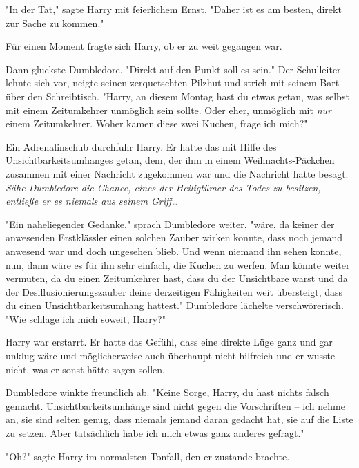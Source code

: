 {"In der Tat," sagte Harry mit feierlichem Ernst. "Daher ist es am besten, direkt zur Sache zu kommen."

Für einen Moment fragte sich Harry, ob er zu weit gegangen war.

Dann gluckste Dumbledore. "Direkt auf den Punkt soll es sein." Der Schulleiter lehnte sich vor, neigte seinen zerquetschten Pilzhut und strich mit seinem Bart über den Schreibtisch. "Harry, an diesem Montag hast du etwas getan, was selbst mit einem Zeitumkehrer unmöglich sein sollte. Oder eher, unmöglich mit \emph{nur} einem Zeitumkehrer. Woher kamen diese zwei Kuchen, frage ich mich?"

Ein Adrenalinschub durchfuhr Harry. Er hatte das mit Hilfe des Unsichtbarkeitsumhanges getan, dem, der ihm in einem Weihnachts-Päckchen zusammen mit einer Nachricht zugekommen war und die Nachricht hatte besagt: \emph{Sähe Dumbledore die Chance, eines der Heiligtümer des Todes zu besitzen, entließe er es niemals aus seinem Griff…}

"Ein naheliegender Gedanke," sprach Dumbledore weiter, "wäre, da keiner der anwesenden Erstklässler einen solchen Zauber wirken konnte, dass noch jemand anwesend war und doch ungesehen blieb. Und wenn niemand ihn sehen konnte, nun, dann wäre es für ihn sehr einfach, die Kuchen zu werfen. Man könnte weiter vermuten, da du einen Zeitumkehrer hast, dass du der Unsichtbare warst und da der Desillusionierungszauber deine derzeitigen Fähigkeiten weit übersteigt, dass du einen Unsichtbarkeitsumhang hattest." Dumbledore lächelte verschwörerisch. "Wie schlage ich mich soweit, Harry?"

Harry war erstarrt. Er hatte das Gefühl, dass eine direkte Lüge ganz und gar unklug wäre und möglicherweise auch überhaupt nicht hilfreich und er wusste nicht, was er sonst hätte sagen sollen.

Dumbledore winkte freundlich ab. "Keine Sorge, Harry, du hast nichts falsch gemacht. Unsichtbarkeitsumhänge sind nicht gegen die Vorschriften -- ich nehme an, sie sind selten genug, dass niemals jemand daran gedacht hat, sie auf die Liste zu setzen. Aber tatsächlich habe ich mich etwas ganz anderes gefragt."

"Oh?" sagte Harry im normalsten Tonfall, den er zustande brachte.

}
